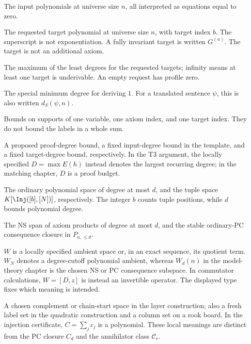 \begin{description}[style=nextline,leftmargin=1em,labelindent=0pt,labelwidth=0pt]
\item[$\Gamma_n$] The input polynomials at universe size $n$, all
interpreted as equations equal to zero.
\item[$G_b^{(n)}$] The requested target polynomial at universe size $n$,
with target index $b$. The superscript is not exponentiation. A fully
invariant target is written $G^{(n)}$. The target is not an additional axiom.
\item[$h_S(n)$] The maximum of the least degrees for the requested
targets; infinity means at least one target is underivable. An empty
request has profile zero.
\item[$d_S(\Gamma_n)$] The special minimum degree for deriving $1$.
For a translated sentence $\psi$, this is also written $d_S(\psi,n)$.
\item[$k,s,t$] Bounds on supports of one variable, one axiom index,
and one target index. They do not bound the labels in a whole sum.
\item[$d,D,D_G$] A proposed proof-degree bound, a fixed input-degree
bound in the template, and a fixed target-degree bound, respectively.
In the T3 argument, the locally specified $D=\max E(h)$ instead denotes
the largest recurring degree; in the matching chapter, $D$ is a proof budget.
\item[$P_{n,\le d},P_b(N)$] The ordinary polynomial space of degree at
most $d$, and the tuple space $K[\Inj([b],[N])]$, respectively.
The integer $b$ counts tuple positions, while $d$ bounds polynomial degree.
\item[$I_d,C_d$] The NS span of axiom products of degree at most $d$,
and the stable ordinary-PC consequence closure in $P_{n,\le d}$.
\item[$W,W_N,W_d(n)$] $W$ is a locally specified ambient space or,
in an exact sequence, its quotient term. $W_N$ denotes a degree-cutoff
polynomial ambient, whereas $W_d(n)$ in the model-theory chapter is
the chosen NS or PC consequence subspace. In commutator calculations,
$W=[D,z]$ is instead an invertible operator. The displayed type fixes
which meaning is intended.
\item[$C$] A chosen complement or chain-start space in the layer
construction; also a fresh label set in the quadratic construction
and a column set on a rook board. In the injection certificate,
$C=\sum_j c_j$ is a polynomial. These local meanings are distinct
from the PC closure $C_d$ and the annihilator class $\mathcal C_r$.

\end{description}
